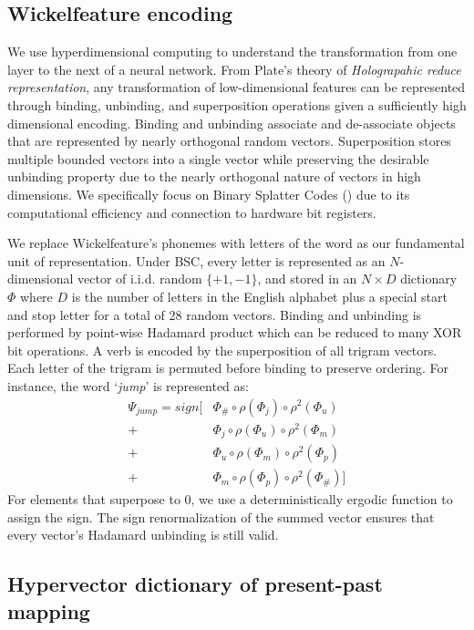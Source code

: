 \documentclass{article}
\begin{document}
\subsection{Wickelfeature encoding}

We use hyperdimensional computing to understand the transformation from one layer to the next of a neural network. From Plate's theory of \emph{Holograpahic reduce representation}, any transformation of low-dimensional features can be represented through binding, unbinding, and superposition operations given a sufficiently high dimensional encoding. Binding and unbinding associate and de-associate objects that are represented by nearly orthogonal random vectors. Superposition stores multiple bounded vectors into a single vector while preserving the desirable unbinding property due to the nearly orthogonal nature of vectors in high dimensions. We specifically focus on Binary Splatter Codes (\citet{Kanerva1994}) due to its computational efficiency and connection to hardware bit registers.

We replace Wickelfeature's phonemes with letters of the word as our fundamental unit of representation. Under BSC, every letter is represented as an $N$-dimensional vector of i.i.d. random $\{+1, -1\}$, and stored in an $N \times D$ dictionary $\Phi$ where $D$ is the number of letters in the English alphabet plus a special start and stop letter for a total of 28 random vectors. Binding and unbinding is performed by point-wise Hadamard product which can be reduced to many XOR bit operations. A verb is encoded by the superposition of all trigram vectors. Each letter of the trigram is permuted before binding to preserve ordering. For instance, the word `\emph{jump}' is represented as:
\begin{align}
\label{eq:wickel}
\Psi_{jump} = sign [& \Phi_{\#} \circ \rho(\Phi_{j}) \circ \rho^2(\Phi_{u}) \\
    	+ & \Phi_j \circ \rho(\Phi_u) \circ \rho^2 (\Phi_m) \nonumber \\
        + & \Phi_u \circ \rho(\Phi_m) \circ \rho^2(\Phi_p) \nonumber \\
        + & \Phi_m \circ \rho(\Phi_p) \circ \rho^2 (\Phi_{\#}) ] \nonumber
\end{align}
For elements that superpose to 0, we use a deterministically ergodic function to assign the sign. The sign renormalization of the summed vector ensures that every vector's Hadamard unbinding is still valid. 


\subsection{Hypervector dictionary of present-past mapping}
\end{document}
